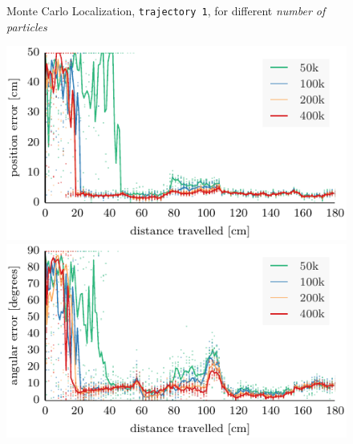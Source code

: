 \documentclass[letterpaper, 10pt, conference]{ieeeconf}
\begin{document}
\begin{figure}
\begin{center}
Monte Carlo Localization, \texttt{trajectory~1}, for different \emph{number of particles}
\end{center}
\includegraphics{mcl-whole_random_1-xy}\hfill
\includegraphics{mcl-whole_random_1-theta}

\vspace{.3em}


\end{figure}
\end{document}

